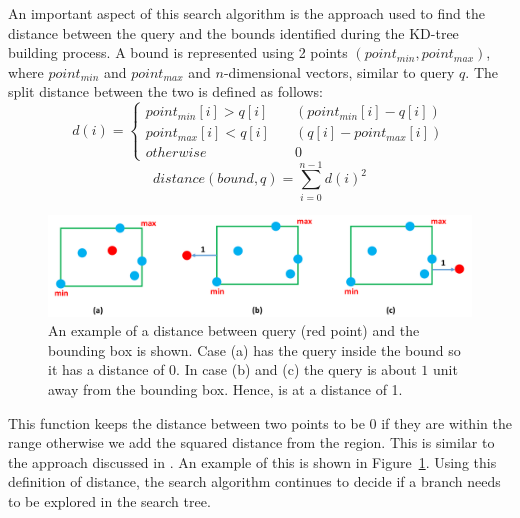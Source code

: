 \documentclass[11pt]{amsart}
\begin{document}
\begin{list}{}{\leftmargin= 1.4cm}
An important aspect of this search algorithm is the approach used to find the distance between the query and the bounds identified during the KD-tree building process. A bound is represented using 2 points $(point_{min}, point_{max})$, where $point_{min}$ and $point_{max}$ and $n$-dimensional vectors, similar to query $q$. The split distance between the two is defined as follows:
\[ d(i) =
  \begin{cases}
    point_{min}[i] > q[i]       & \quad (point_{min}[i] - q[i])\\
    point_{max}[i] < q[i]       & \quad (q[i] - point_{max}[i]) \\
    otherwise                      & \quad 0
  \end{cases}
\]
\[distance(bound, q) =  \sum_{i = 0}^{n-1} d(i)^{2}\]

\begin{figure}[t!]
\centering
\includegraphics[width=\linewidth]{images/bound_distance}
\caption{An example of a distance between query (red point) and the bounding box is shown. Case (a) has the query inside the bound so it has a distance of 0. In case (b) and (c) the query is about $1$ unit away from the bounding box. Hence, is at a distance of 1.}
\label{fig:bound_distance}
\end{figure}

This function keeps the distance between two points to be 0 if they are within the range otherwise we add the squared distance from the region. This is similar to the approach discussed in \cite{bounding_distance}.  An example of this is shown in Figure~\ref{fig:bound_distance}. Using this definition of distance, the search algorithm continues to decide if a branch needs to be explored in the search tree.
\end{list}
\end{document}
